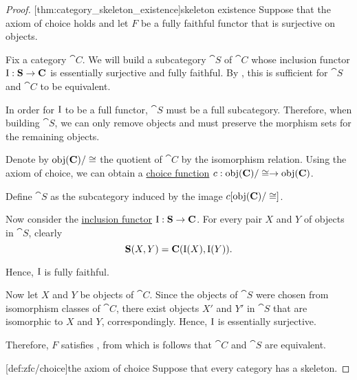 \begin{proof}
  [thm:category_skeleton_existence]{skeleton existence} Suppose that the axiom of choice holds and let \( F \) be a fully faithful functor that is surjective on objects.

  Fix a category \( \cat{C} \). We will build a subcategory \( \cat{S} \) of \( \cat{C} \) whose inclusion functor \( \operatorname{I}: \operatorname{\mathbf{S}} \to \operatorname{\mathbf{C}} \) is essentially surjective and fully faithful. By , this is sufficient for \( \cat{S} \) and \( \cat{C} \) to be equivalent.

  In order for \( \operatorname{I} \) to be a full functor, \( \cat{S} \) must be a full subcategory. Therefore, when building \( \cat{S} \), we can only remove objects and must preserve the morphism sets for the remaining objects.

  Denote by \( \operatorname{obj}(\operatorname{\mathbf{C}}) / \cong \) the quotient of \( \cat{C} \) by the isomorphism relation. Using the axiom of choice, we can obtain a \hyperref[def:choice_function]{choice function} \( c: \operatorname{obj}(\operatorname{\mathbf{C}}) / \cong \to \operatorname{obj}(\operatorname{\mathbf{C}}) \).

  Define \( \cat{S} \) as the subcategory induced by the image \( c[\operatorname{obj}(\operatorname{\mathbf{C}}) / \cong] \).

  Now consider the \hyperref[def:functor/inclusion]{inclusion functor} \( \operatorname{I}: \operatorname{\mathbf{S}} \to \operatorname{\mathbf{C}} \). For every pair \( X \) and \( Y \) of objects in \( \cat{S} \), clearly
  \begin{equation*}
    \operatorname{\mathbf{S}}(X, Y) = \operatorname{\mathbf{C}}(\operatorname{I}(X), \operatorname{I}(Y)).
  \end{equation*}

  Hence, \( \operatorname{I} \) is fully faithful.

  Now let \( X \) and \( Y \) be objects of \( \cat{C} \). Since the objects of \( \cat{S} \) were chosen from isomorphism classes of \( \cat{C} \), there exist objects \( X' \) and \( Y' \) in \( \cat{S} \) that are isomorphic to \( X \) and \( Y \), correspondingly. Hence, \( \operatorname{I} \) is essentially surjective.

  Therefore, \( F \) satisfies , from which is follows that \( \cat{C} \) and \( \cat{S} \) are equivalent.

  [def:zfc/choice]{the axiom of choice} Suppose that every category has a skeleton.


\end{proof}
